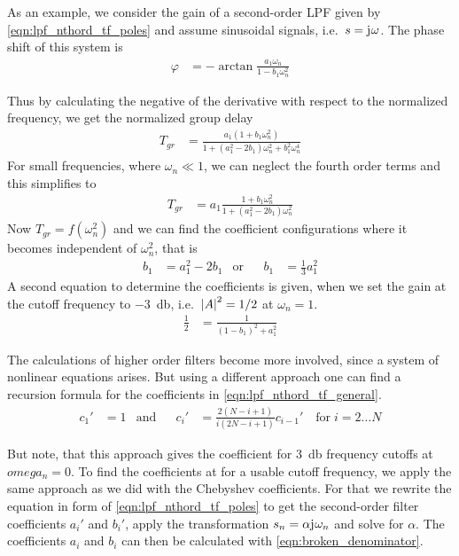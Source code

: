 As an example, we consider the gain of a second-order \ac{LPF} given by \eqref{eqn:lpf_nthord_tf_poles} and assume sinusoidal signals, i.e.\ $s=\mathrm{j}\mkern1mu\omega$. The phase shift of this system is
\begin{align}
  \varphi &= -\arctan\frac{a_1\omega_n}{1-b_1\omega_n^2}
\end{align}

Thus by calculating the negative of the derivative with respect to the normalized frequency, we get the normalized group delay
\begin{align}
  T_{gr} &= \frac{a_1(1+b_1\omega_n^2)}{1+(a_1^2-2b_1)\omega_n^2+b_1^2\omega_n^4}
\end{align}
For small frequencies, where $\omega_n\ll 1$, we can neglect the fourth order terms and this simplifies to
\begin{align}
  T_{gr} &= a_1\frac{1+b_1\omega_n^2}{1+(a_1^2-2b_1)\omega_n^2}
\end{align}
Now $T_{gr}=f(\omega_n^2)$ and we can find the coefficient configurations where it becomes independent of $\omega_n^2$, that is
\begin{align}
  &&b_1 &= a_1^2-2b_1 &\text{or}& &b_1 &= \frac{1}{3}a_1^2&&
\end{align}
A second equation to determine the coefficients is given, when we set the gain at the cutoff frequency to \SI{-3}{\decibel}, i.e.\ $\abs{A}^2=1/2$ at $\omega_n=1$.
\begin{align}
  \frac{1}{2} &= \frac{1}{(1-b_1)^2+a_1^2}
\end{align}

The calculations of higher order filters become more involved, since a system of nonlinear equations arises. But using a different approach one can find a recursion formula for the coefficients in \eqref{eqn:lpf_nthord_tf_general}.
\begin{align}
  &&c_1' &= 1 &\text{and}&  &c_i' &= \frac{2(N-i+1)}{i(2N-i+1)}c_{i-1}'\quad\text{for}\;i=2\dots N&&
\end{align}

But note, that this approach gives the coefficient for \SI{3}{\decibel} frequency cutoffs at $omega_n=0$. To find the coefficients at for a usable cutoff frequency, we apply the same approach as we did with the Chebyshev coefficients. For that we rewrite the equation in form of \eqref{eqn:lpf_nthord_tf_poles} to get the second-order filter coefficients $a_i'$ and $b_i'$, apply the transformation $s_n=\alpha\mathrm{j}\mkern1mu\omega_n$ and solve for $\alpha$. The coefficients $a_i$ and $b_i$ can then be calculated with \eqref{eqn:broken_denominator}.

